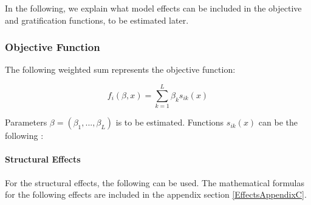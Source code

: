 \documentclass[11pt]{report}
\begin{document}
In the following, we explain what model effects can be included in the objective and gratification functions, to be estimated later.

\subsubsection{Objective Function}
The following weighted sum represents the objective function:

\begin{equation}
f_i(\beta, x) = \sum_{k = 1}^{L} \beta_k s_{ik}(x)
\end{equation}

Parameters $\beta = (\beta_1, ..., \beta_L)$ is to be estimated. Functions $s_{ik}(x)$ can be the following \cite{Snijders2004}:

\paragraph{Structural Effects}
For the structural effects, the following can be used. The mathematical formulas for the following effects are included in the appendix section \ref{EffectsAppendixC}. 
\end{document}
